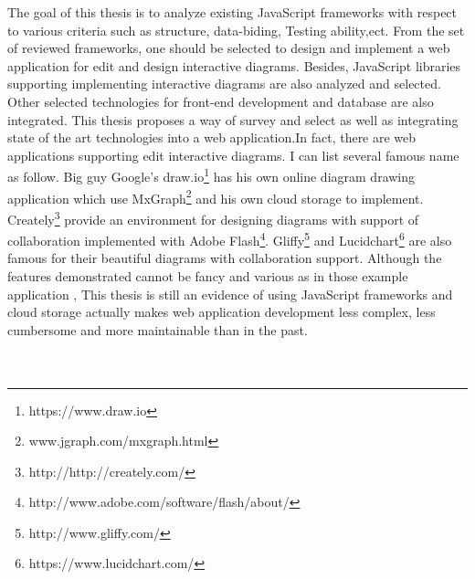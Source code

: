 \documentclass[14pt,a4paper]{extreport}
\begin{document}
The goal of this thesis is to analyze existing JavaScript frameworks with respect to various criteria such as structure, data-biding, Testing ability,ect. From the set of reviewed frameworks, one should be selected to design and implement a web application for edit and design interactive diagrams. Besides, JavaScript libraries supporting implementing interactive diagrams are also analyzed and selected. Other selected technologies for front-end development and database are also integrated. This thesis proposes a way of survey and select  as well as integrating state of the art technologies into a web application.In fact, there are web applications supporting edit interactive diagrams. I can list several famous name as follow. Big guy Google's draw.io\footnote{https://www.draw.io} has his own online diagram drawing application which use MxGraph\footnote{www.jgraph.com/mxgraph.html‎} and his own cloud storage to implement. Creately\footnote{http://http://creately.com/} provide an environment for designing diagrams with support of collaboration implemented with Adobe Flash\footnote{http://www.adobe.com/software/flash/about/}. Gliffy\footnote{http://www.gliffy.com/} and Lucidchart\footnote{https://www.lucidchart.com/} are also famous for their beautiful diagrams with collaboration support. Although the features demonstrated cannot be fancy and various as in those example application , This thesis is still an evidence of using JavaScript frameworks and cloud storage actually makes web application development less complex, less cumbersome and more maintainable than in the past.
\\
\\
\\
\end{document}

